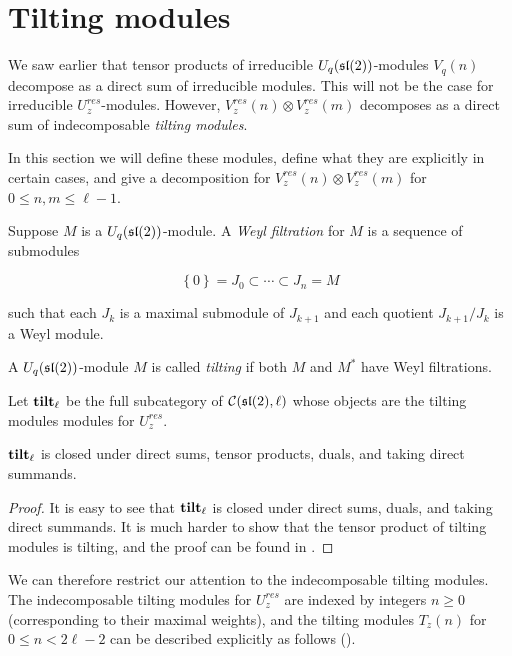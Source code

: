 \section{Tilting modules} 

We saw earlier that tensor products of irreducible $U_q(\mathfrak{sl}(2))$-modules
$V_q(n)$ decompose as a direct sum of irreducible modules. This will not be the
case for irreducible $U_z^{res}$-modules. However, $V_z^{res}(n)\otimes
V_z^{res}(m)$ decomposes as a direct sum of indecomposable \emph{tilting
modules}. 

In this section we will define these modules, define what they are explicitly
in certain cases, and give a decomposition for $V^{res}_z(n) \otimes
V_z^{res}(m)$ for $0 \leq n,m \leq \ell - 1$.

\begin{defn}
    Suppose $M$ is a $U_q(\mathfrak{sl}(2))$-module. A \emph{Weyl filtration} for $M$
    is a sequence of submodules 

    \begin{equation}
        \left\{ 0 \right\} = J_0 \subset \cdots \subset J_n = M
    \end{equation}

    such that each $J_k$ is a maximal submodule of $J_{k+1}$ and each quotient $J_{k+1}/J_k$ is a Weyl module. 
\end{defn}

\begin{defn}
    A $U_q(\mathfrak{sl}(2))$-module $M$ is called \emph{tilting} if both $M$ and $M^*$ have Weyl filtrations.
\end{defn}

Let $\mathbf{tilt}_\ell$ be the full subcategory of $\mathcal{C}(\mathfrak{sl}(2), \ell)$ whose
objects are the tilting modules modules for $U_z^{res}$.  

\begin{prop}
    $\mathbf{tilt}_\ell$ is closed under direct sums, tensor products, duals, and taking direct summands.
\end{prop}
\begin{proof}
    It is easy to see that $\mathbf{tilt}_\ell$ is closed under direct sums, duals, and
    taking direct summands. It is much harder to show that the tensor product
    of tilting modules is tilting, and the proof can be found in \cite{Andersen1992}.
\end{proof}

We can therefore restrict our attention to the indecomposable tilting modules.
The indecomposable tilting modules for $U_z^{res}$ are indexed by integers $n
\geq 0$ (corresponding to their maximal weights), and the tilting modules
$T_z(n)$ for $0 \leq n < 2\ell - 2$ can be described explicitly as follows
(\cite{CP}). 

